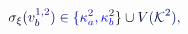 \documentclass[12pt]{article}
\begin{document}
\makeatletter
\renewcommand*{\@textcolor}[3]{%
  \protect\leavevmode
  \begingroup
    \color#1{#2}#3%
  \endgroup
}
\makeatother
\begin{displaymath}
\mathcolor[RGB]{0,0,15}{\sigma} _ { \mathcolor[RGB]{0,0,30}{\xi} } \mathcolor[RGB]{0,0,45}{(} \mathcolor[RGB]{0,0,60}{v} _ { \mathcolor[RGB]{0,0,75}{b} } ^ { \mathcolor[RGB]{0,0,90}{1} \mathcolor[RGB]{0,0,105}{,} \mathcolor[RGB]{0,0,120}{2} } \mathcolor[RGB]{0,0,135}{)} \mathcolor[RGB]{0,0,150}{\in} \mathcolor[RGB]{0,0,165}{\{} \mathcolor[RGB]{0,0,180}{\kappa} _ { \mathcolor[RGB]{0,0,195}{a} } ^ { \mathcolor[RGB]{0,0,210}{2} } \mathcolor[RGB]{0,0,225}{,} \mathcolor[RGB]{0,0,240}{\kappa} _ { \mathcolor[RGB]{0,0,255}{b} } ^ { \mathcolor[RGB]{0,15,0}{2} } \mathcolor[RGB]{0,15,15}{\}} \mathcolor[RGB]{0,15,30}{\cup} \mathcolor[RGB]{0,15,45}{V} \mathcolor[RGB]{0,15,60}{(} \mathcal { \mathcolor[RGB]{0,15,75}{K} } ^ { \mathcolor[RGB]{0,15,90}{2} } \mathcolor[RGB]{0,15,105}{)} \mathcolor[RGB]{0,15,120}{,}
\end{displaymath}
\end{document}
